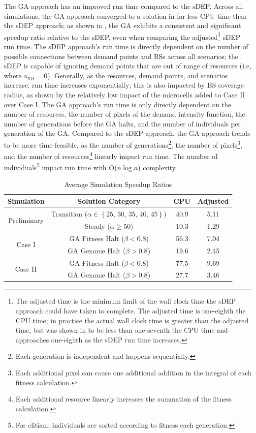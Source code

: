 \documentclass[12pt,dvipsnames]{report}
\begin{document}
The GA approach has an improved run time compared to the sDEP.  Across all simulations, the GA approach converged to a solution in far less CPU time than the sDEP approach; as shown in , the GA exhibits a consistent and significant speedup ratio relative to the sDEP, even when comparing the adjusted\footnote{The adjusted time is the minimum limit of the wall clock time the sDEP approach could have taken to complete.  The adjusted time is one-eighth the CPU time; in practice the actual wall clock time is greater than the adjusted time, but was shown in  to be less than one-seventh the CPU time and approaches one-eighth as the sDEP run time increases.} sDEP run time.  The sDEP approach's run time is directly dependent on the number of possible connections between demand points and BSs across all scenarios; the sDEP is capable of ignoring demand points that are out of range of resources (i.e, where $u_{ms}=0$).  Generally, as the resources, demand points, and scenarios increase, run time increases exponentially; this is also impacted by BS coverage radius, as shown by the relatively low impact of the microcells added to Case II over Case I.  The GA approach's run time is only directly dependent on the number of resources, the number of pixels of the demand intensity function, the number of generations before the GA halts, and the number of individuals per generation of the GA.  Compared to the sDEP approach, the GA approach trends to be more time-feasible, as the number of generations\footnote{Each generation is independent and happens sequentially.}, the number of pixels\footnote{Each additional pixel can cause one additional addition in the integral of each fitness calculation.}, and the number of resources\footnote{Each additional resource linearly increases the summation of the fitness calculation.} linearly impact run time.  The number of individuals\footnote{For elitism, individuals are sorted according to fitness each generation.} impact run time with O($n \log n$) complexity.

\begin{table}[ht]
	\centering
	\caption{Average Simulation Speedup Ratios}
	\begin{tabular}{|c|c|c|c|} 
		\hline
		\textbf{Simulation} & \textbf{Solution Category} & \textbf{CPU} & \textbf{Adjusted} \\
		\hline
		\multirow{2}{*}{Preliminary} & Transition ($\alpha \in \left\{ 25,\, 30,\, 35,\, 40,\, 45 \right\}$) & 40.9 & 5.11 \\
		& Steady ($\alpha \geq 50$) & 10.3 & 1.29 \\
		\hline
		\multirow{2}{*}{Case I} & GA Fitness Halt ($\beta < 0.8$) & 56.3 & 7.04 \\
		& GA Genome Halt ($\beta > 0.8$) & 19.6 & 2.45 \\
		\hline
		\multirow{2}{*}{Case II} & GA Fitness Halt ($\beta < 0.8$) & 77.5 & 9.69 \\
		& GA Genome Halt ($\beta > 0.8$) & 27.7 & 3.46 \\
		\hline
	\end{tabular}
	\label{tab:VWNConstructionRunTimes}
\end{table}
\end{document}
